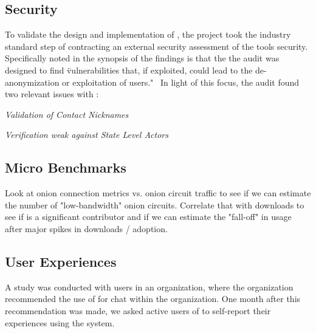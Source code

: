 \subsection{Security}

To validate the design and implementation of \systemname, the project took the
industry standard step of contracting an external security assessment of the
tools security. Specifically noted in the synopsis of the findings is that
the the audit was designed to find \"vulnerabilities that, if exploited,
could lead to the de-anonymization or exploitation of \systemname users."~\cite{securityAudit}
In light of this focus, the audit found two relevant issues with \systemname:

\textit{Validation of Contact Nicknames}

\textit{Verification weak against State Level Actors}

\subsection{Micro Benchmarks}

Look at onion connection metrics vs. onion circuit traffic to see if we can
estimate the number of "low-bandwidth" onion circuits. Correlate that with
downloads to see if \systemname is a significant contributor and if we can
estimate the "fall-off" in usage after major spikes in downloads / adoption.


\subsection{User Experiences}

A study was conducted with  users in an organization, where the
organization recommended the use of \systemname for chat within the
organization. One month after this recommendation was made, we asked active
users of \systemname to self-report their experiences using the system.



